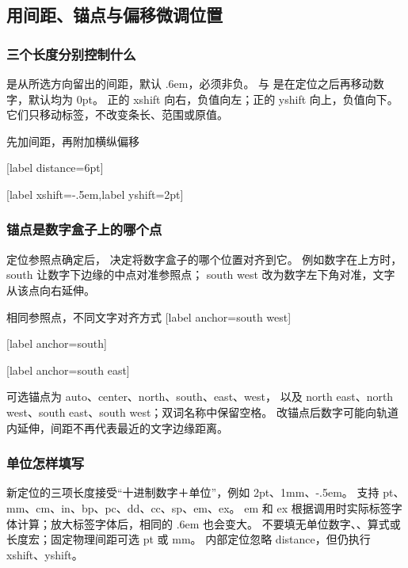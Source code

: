 \subsection{用间距、锚点与偏移微调位置}
\label{sec:command-offsets-cn}
\subsubsection{三个长度分别控制什么}
 是从所选方向留出的间距，默认 .6em，必须非负。
 与  是在定位之后再移动数字，默认均为 0pt。
正的 xshift 向右，负值向左；正的 yshift 向上，负值向下。
它们只移动标签，不改变条长、范围或原值。
\begin{example}[text and listing,sidebyside=false]{先加间距，再附加横纵偏移}
\begingroup
\gradbarsnewcommand[
  args={m O{}},data={#1},options={#2},
  max=1,width=40mm,height=5pt,precision=3,theme=gray,
  label position=above,label reference=value,label distance=2pt
]{\offsetbar}
\par\medskip
{}[label distance=6pt]\par\medskip
{}[label xshift=-.5em,label yshift=2pt]
\endgroup
\end{example}

\subsubsection{锚点是数字盒子上的哪个点}
定位参照点确定后， 决定将数字盒子的哪个位置对齐到它。
例如数字在上方时，south 让数字下边缘的中点对准参照点；
south west 改为数字左下角对准，文字从该点向右延伸。
\begin{example}[text and listing,sidebyside=false]{相同参照点，不同文字对齐方式}
\begingroup
\gradbarsnewcommand[
  args={m O{}},data={#1},options={#2},max=1,
  width=40mm,height=5pt,precision=3,theme=gray,
  label position=above,label reference=value,label distance=2pt
]{\anchorbar}
[label anchor=south west]\par\medskip
{}[label anchor=south]\par\medskip
{}[label anchor=south east]
\endgroup
\end{example}
可选锚点为 auto、center、north、south、east、west，
以及 north east、north west、south east、south west；双词名称中保留空格。
改锚点后数字可能向轨道内延伸，间距不再代表最近的文字边缘距离。

\subsubsection{单位怎样填写}
新定位的三项长度接受“十进制数字＋单位”，例如 2pt、1mm、-.5em。
支持 pt、mm、cm、in、bp、pc、dd、cc、sp、em、ex。
em 和 ex 根据调用时实际标签字体计算；放大标签字体后，相同的 .6em 也会变大。
不要填无单位数字、\key{\dimexpr}、算式或长度宏；固定物理间距可选 pt 或 mm。
内部定位忽略 distance，但仍执行 xshift、yshift。

